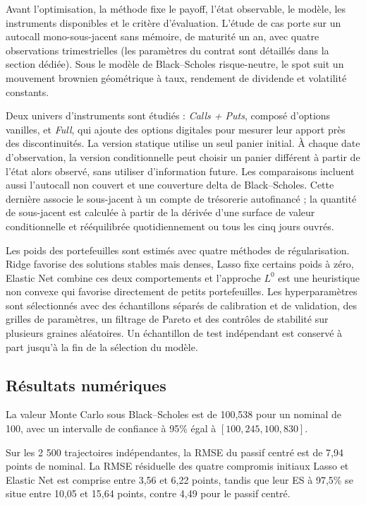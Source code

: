 \documentclass[12pt,a4paper]{article}
\newcommand{\1}{\mathbf{1}}
\begin{document}
Avant l'optimisation, la méthode fixe le payoff, l'état observable, le modèle, les instruments disponibles et le critère d'évaluation. L'étude de cas porte sur un autocall mono-sous-jacent sans mémoire, de maturité un an, avec quatre observations trimestrielles (les paramètres du contrat sont détaillés dans la section dédiée). Sous le modèle de Black--Scholes risque-neutre, le spot suit un mouvement brownien géométrique à taux, rendement de dividende et volatilité constants.

Deux univers d'instruments sont étudiés : \emph{Calls + Puts}, composé d'options vanilles, et \emph{Full}, qui ajoute des options digitales pour mesurer leur apport près des discontinuités. La version statique utilise un seul panier initial. À chaque date d'observation, la version conditionnelle peut choisir un panier différent à partir de l'état alors observé, sans utiliser d'information future. Les comparaisons incluent aussi l'autocall non couvert et une couverture delta de Black--Scholes. Cette dernière associe le sous-jacent à un compte de trésorerie autofinancé ; la quantité de sous-jacent est calculée à partir de la dérivée d'une surface de valeur conditionnelle et rééquilibrée quotidiennement ou tous les cinq jours ouvrés.

Les poids des portefeuilles sont estimés avec quatre méthodes de régularisation. Ridge favorise des solutions stables mais denses, Lasso fixe certains poids à zéro, Elastic Net combine ces deux comportements et l'approche $L^0$ est une heuristique non convexe qui favorise directement de petits portefeuilles. Les hyperparamètres sont sélectionnés avec des échantillons séparés de calibration et de validation, des grilles de paramètres, un filtrage de Pareto et des contrôles de stabilité sur plusieurs graines aléatoires. Un échantillon de test indépendant est conservé à part jusqu'à la fin de la sélection du modèle.

\subsection*{Résultats numériques}

La valeur Monte Carlo sous Black--Scholes est de 100,538 pour un nominal de 100, avec un intervalle de confiance à 95\% égal à $[100{,}245,100{,}830]$.

{Sur les 2 500 trajectoires indépendantes, la RMSE du passif centré est de 7,94 points de nominal. La RMSE résiduelle des quatre compromis initiaux Lasso et Elastic Net est comprise entre 3,56 et 6,22 points, tandis que leur ES à 97,5\% se situe entre 10,05 et 15,64 points, contre 4,49 pour le passif centré.}
\end{document}
